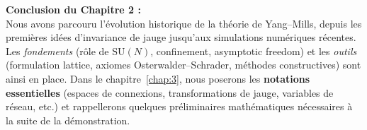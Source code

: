 \noindent
\textbf{Conclusion du Chapitre 2 :}\\
Nous avons parcouru l'évolution historique de la théorie de Yang--Mills, depuis les premières idées d'invariance de jauge jusqu'aux simulations numériques récentes. Les \emph{fondements} (rôle de \(\mathrm{SU}(N)\), confinement, asymptotic freedom) et les \emph{outils} (formulation lattice, axiomes Osterwalder--Schrader, méthodes constructives) sont ainsi en place.  
Dans le chapitre~\ref{chap:3}, nous poserons les \textbf{notations essentielles} (espaces de connexions, transformations de jauge, variables de réseau, etc.) et rappellerons quelques préliminaires mathématiques nécessaires à la suite de la démonstration.

\vspace{2em}

